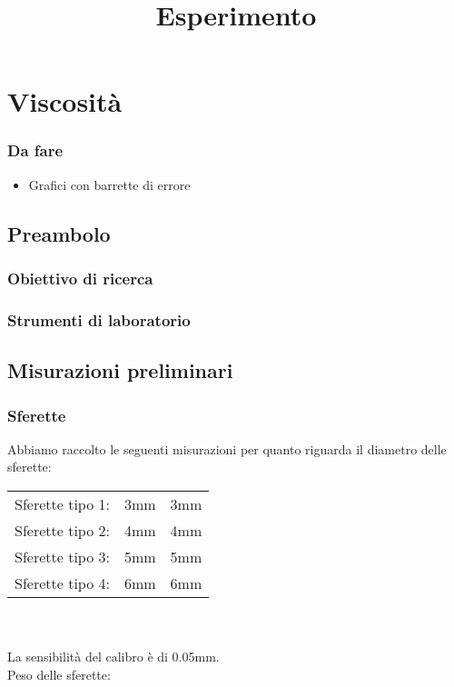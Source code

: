 \documentclass[a4paper,10pt]{report}
\title{Esperimento}
\begin{document}
\maketitle

\chapter{Viscosità}
\subsection{Da fare}
\begin{itemize}
 \item Grafici con barrette di errore
\end{itemize}

\section{Preambolo}
\subsection{Obiettivo di ricerca}
\subsection{Strumenti di laboratorio}

\section{Misurazioni preliminari}
\subsection{Sferette}
Abbiamo raccolto le seguenti misurazioni per quanto riguarda il diametro delle sferette:
\\

\begin{tabular}{|l|l|l|}
 \toprule
 Sferette tipo 1: & 3mm & 3mm \\
 Sferette tipo 2: & 4mm & 4mm \\
 Sferette tipo 3: & 5mm & 5mm \\
 Sferette tipo 4: & 6mm & 6mm \\
 \bottomrule
\end{tabular}
\\
\\
La sensibilità del calibro è di 0.05mm.\\
Peso delle sferette:
\\
\end{document}
